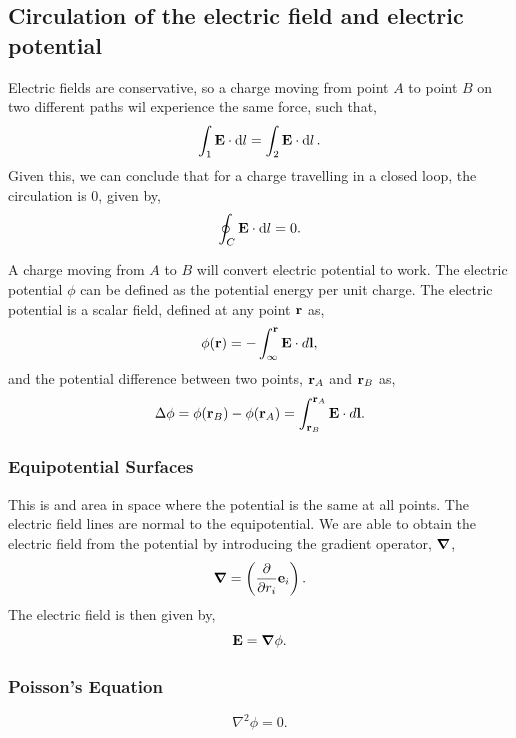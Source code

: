\documentclass{book}
\begin{document}
\subsection{Circulation of the electric field and electric potential}
Electric fields are conservative, so a charge moving from point $A$ to point $B$ on two different paths wil experience the same force, such that,
\begin{equation}
    \int_1 \vb{E}\cdot\dd{l} = \int_2 \vb{E}\cdot \dd{l}.
\end{equation}
Given this, we can conclude that for a charge travelling in a closed loop, the circulation is 0, given by,
\begin{equation}
    \oint_C \vb{E}\cdot\dd{l} = 0.
\end{equation}

A charge moving from $A$ to $B$ will convert electric potential to work. The electric potential $\phi$ can be defined as the potential energy per unit charge. The electric potential is a scalar field, defined at any point $\vb{r}$ as,
\begin{equation}
    \phi(\vb{r}) = -\int_{\infty}^{\vb{r}} \vb{E}\cdot d\vb{l},
\end{equation}
and the potential difference between two points, $\vb{r}_A$ and $\vb{r}_B$ as,
\begin{equation}
    \Delta\phi = \phi(\vb{r}_B) - \phi(\vb{r}_A) = \int_{\vb{r}_B}^{\vb{r}_A}\vb{E}\cdot d\vb{l}.\label{potdiff}
\end{equation}
\subsubsection{Equipotential Surfaces}
This is and area in space where the potential is the same at all points. The electric field lines are normal to the equipotential. We are able to obtain the electric field from the potential by introducing the gradient operator, $\grad$,
\begin{equation}
    \grad = \left(\pdv{}{r_i}\vb{e}_i\right).
\end{equation}
The electric field is then given by,
\begin{equation}
    \vb{E} = \grad \phi.
\end{equation}
\subsubsection{Poisson's Equation}
\begin{equation}
    \nabla^2\phi = 0.
\end{equation}
\end{document}
